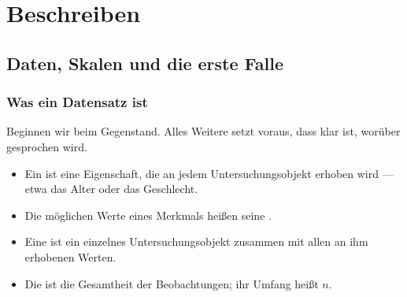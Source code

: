 \part{Beschreiben}

\chapter{Daten, Skalen und die erste Falle}

\section{Was ein Datensatz ist}

Beginnen wir beim Gegenstand. Alles Weitere setzt voraus, dass klar ist, worüber gesprochen wird.

\begin{definition}
\begin{itemize}[leftmargin=1.4em, itemsep=4pt]
\item Ein  ist eine Eigenschaft, die an jedem Untersuchungsobjekt erhoben wird --- etwa das Alter oder das Geschlecht.
\item Die möglichen Werte eines Merkmals heißen seine .
\item Eine  ist ein einzelnes Untersuchungsobjekt zusammen mit allen an ihm erhobenen Werten.
\item Die  ist die Gesamtheit der Beobachtungen; ihr Umfang heißt $n$.
\end{itemize}
\end{definition}


